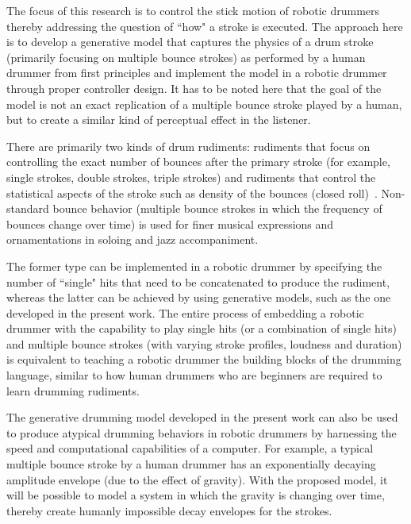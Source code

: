 \documentclass[final,1p,times]{elsarticle}
\begin{document}
The focus of this research is to control the stick motion of robotic drummers thereby addressing the question of ``how" a stroke is executed. The approach here is to develop a generative model that captures the physics of a drum stroke (primarily focusing on multiple bounce strokes) as performed by a human drummer from first principles and implement the model in a robotic drummer through proper controller design. It has to be noted here that the goal of the model is not an exact replication of a multiple bounce stroke played by a human, but to create a similar kind of perceptual effect in the listener. 

There are primarily two kinds of drum rudiments: rudiments that focus on controlling the exact number of bounces after the primary stroke (for example, single strokes, double strokes, triple strokes) and rudiments that control the statistical aspects of the stroke such as density of the bounces (closed roll)~\cite{rich2005buddy}. Non-standard bounce behavior (multiple bounce strokes in which the frequency of bounces change over time) is used for finer musical expressions and ornamentations in soloing and jazz accompaniment.

The former type can be implemented in a robotic drummer by specifying the number of ``single" hits that need to be concatenated to produce
the rudiment, whereas the latter can be achieved by using generative
models, such as the one developed in the present work. The entire process of embedding a robotic drummer with the capability to play single hits (or a combination of single hits) and multiple bounce strokes (with varying stroke profiles, loudness and duration) is equivalent to teaching a robotic drummer the building blocks of the drumming language, similar to how human drummers who are beginners are required to learn drumming rudiments.

The generative drumming model developed in the present work can also be used to produce atypical drumming behaviors in robotic drummers	by harnessing the speed and computational capabilities of a computer. For
example, a typical multiple bounce stroke by a human drummer has an exponentially decaying amplitude envelope (due to the effect of gravity). With the proposed model, it will be possible to model a system in which the gravity is changing over time, thereby create humanly impossible decay envelopes for the strokes. 
\end{document}
